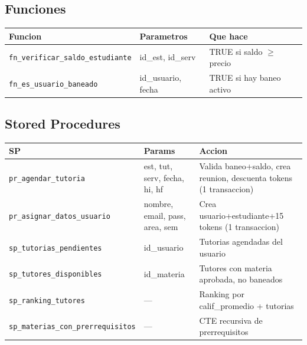 \documentclass[10pt,a4paper]{article}
\begin{document}
\subsection{Funciones}
\begin{longtable}{lp{5cm}p{5cm}}
\toprule
\textbf{Funcion} & \textbf{Parametros} & \textbf{Que hace} \\
\midrule
\texttt{fn\_verificar\_saldo\_estudiante} & id\_est, id\_serv & TRUE si saldo $\geq$ precio \\
\texttt{fn\_es\_usuario\_baneado} & id\_usuario, fecha & TRUE si hay baneo activo \\
\bottomrule
\end{longtable}

\subsection{Stored Procedures}
\begin{longtable}{llp{6cm}}
\toprule
\textbf{SP} & \textbf{Params} & \textbf{Accion} \\
\midrule
\texttt{pr\_agendar\_tutoria} & est, tut, serv, fecha, hi, hf & Valida baneo+saldo, crea reunion, descuenta tokens (1 transaccion) \\
\texttt{pr\_asignar\_datos\_usuario} & nombre, email, pass, area, sem & Crea usuario+estudiante+15 tokens (1 transaccion) \\
\texttt{sp\_tutorias\_pendientes} & id\_usuario & Tutorias agendadas del usuario \\
\texttt{sp\_tutores\_disponibles} & id\_materia & Tutores con materia aprobada, no baneados \\
\texttt{sp\_ranking\_tutores} & --- & Ranking por calif\_promedio + tutorias \\
\texttt{sp\_materias\_con\_prerrequisitos} & --- & CTE recursiva de prerrequisitos \\
\bottomrule
\end{longtable}
\end{document}

